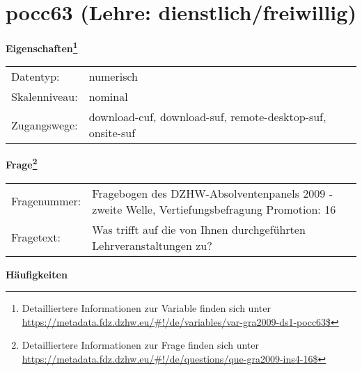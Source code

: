 
    \setcounter{footnote}{0}

    \vspace*{-1.8cm}
	\section{pocc63 (Lehre: dienstlich/freiwillig)}
	\label{section:pocc63}



    \vspace*{0.5cm}
    \noindent\textbf{Eigenschaften\footnote{Detailliertere Informationen zur Variable finden sich unter
		\url{https://metadata.fdz.dzhw.eu/\#!/de/variables/var-gra2009-ds1-pocc63$}}}\\
	\begin{tabularx}{\hsize}{@{}lX}
	Datentyp: & numerisch \\
	Skalenniveau: & nominal \\
	Zugangswege: &
	  download-cuf, 
	  download-suf, 
	  remote-desktop-suf, 
	  onsite-suf
 \\
    \end{tabularx}



				\vspace*{0.5cm}
                \noindent\textbf{Frage\footnote{Detailliertere Informationen zur Frage finden sich unter
		              \url{https://metadata.fdz.dzhw.eu/\#!/de/questions/que-gra2009-ins4-16$}}}\\
				\begin{tabularx}{\hsize}{@{}lX}
					Fragenummer: &
					  Fragebogen des DZHW-Absolventenpanels 2009 - zweite Welle, Vertiefungsbefragung Promotion:
					  16
 \\
					Fragetext: & Was trifft auf die von Ihnen durchgeführten Lehrveranstaltungen zu? \\
				\end{tabularx}





        		\vspace*{0.5cm}
                \noindent\textbf{Häufigkeiten}

